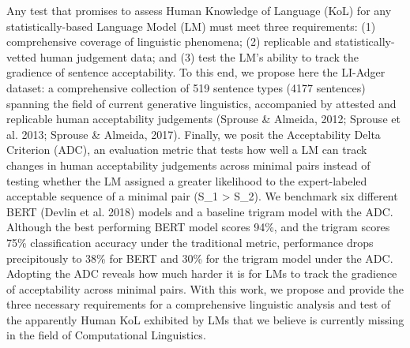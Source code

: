 Any test that promises to assess Human Knowledge of Language (KoL) for any statistically-based Language Model (LM) must meet three requirements: (1) comprehensive coverage of linguistic phenomena; (2) replicable and statistically-vetted human judgement data; and (3) test the LM's ability to track the gradience of sentence acceptability.  To this end, we propose here the LI-Adger dataset: a comprehensive collection of 519 sentence types (4177 sentences) spanning the field of current generative linguistics, accompanied by attested and replicable human acceptability judgements (Sprouse \& Almeida, 2012; Sprouse et al. 2013; Sprouse \& Almeida, 2017).  Finally, we posit the Acceptability Delta Criterion (ADC), an evaluation metric that tests how well a LM can track changes in human acceptability judgements across minimal pairs instead of testing whether the LM assigned a greater likelihood to the expert-labeled acceptable sequence of a minimal pair (S\_1 > S\_2).  We benchmark six different BERT (Devlin et al. 2018) models and a baseline trigram model with the ADC.  Although the best performing BERT model scores 94\%, and the trigram scores 75\% classification accuracy under the traditional metric, performance drops precipitously to 38\% for BERT and 30\% for the trigram model under the ADC.  Adopting the ADC reveals how much harder it is for LMs to track the gradience of acceptability across minimal pairs.  With this work, we propose and provide the three necessary requirements for a comprehensive linguistic analysis and test of the apparently Human KoL exhibited by LMs that we believe is currently missing in the field of Computational Linguistics.
